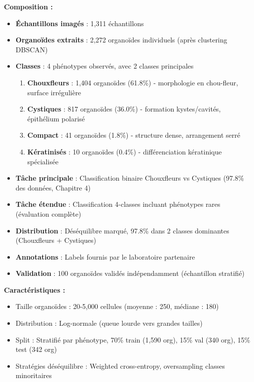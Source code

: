 \textbf{Composition :}
\begin{itemize}
    \item \textbf{Échantillons imagés} : 1,311 échantillons
    \item \textbf{Organoïdes extraits} : 2,272 organoïdes individuels (après clustering DBSCAN)
    \item \textbf{Classes} : 4 phénotypes observés, avec 2 classes principales
    \begin{enumerate}
        \item \textbf{Chouxfleurs} : 1,404 organoïdes (61.8\%) - morphologie en chou-fleur, surface irrégulière
        \item \textbf{Cystiques} : 817 organoïdes (36.0\%) - formation kystes/cavités, épithélium polarisé
        \item \textbf{Compact} : 41 organoïdes (1.8\%) - structure dense, arrangement serré
        \item \textbf{Kératinisés} : 10 organoïdes (0.4\%) - différenciation kératinique spécialisée
    \end{enumerate}
    \item \textbf{Tâche principale} : Classification binaire Chouxfleurs vs Cystiques (97.8\% des données, Chapitre 4)
    \item \textbf{Tâche étendue} : Classification 4-classes incluant phénotypes rares (évaluation complète)
    \item \textbf{Distribution} : Déséquilibre marqué, 97.8\% dans 2 classes dominantes (Chouxfleurs + Cystiques)
    \item \textbf{Annotations} : Labels fournis par le laboratoire partenaire
    \item \textbf{Validation} : 100 organoïdes validés indépendamment (échantillon stratifié)
\end{itemize}

\textbf{Caractéristiques :}
\begin{itemize}
    \item Taille organoïdes : 20-5,000 cellules (moyenne : 250, médiane : 180)
    \item Distribution : Log-normale (queue lourde vers grandes tailles)
    \item Split : Stratifié par phénotype, 70\% train (1,590 org), 15\% val (340 org), 15\% test (342 org)
    \item Stratégies déséquilibre : Weighted cross-entropy, oversampling classes minoritaires
\end{itemize}

